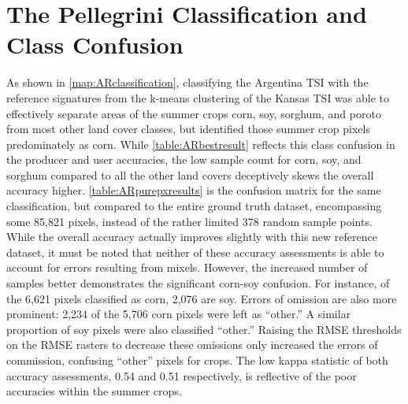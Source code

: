 \section{The Pellegrini Classification and Class Confusion}

As shown in \autoref{map:ARclassification}, classifying the Argentina TSI with the reference signatures from the k-means clustering of the Kansas TSI was able to effectively separate areas of the summer crops corn, soy, sorghum, and poroto from most other land cover classes, but identified those summer crop pixels predominately as corn. While \autoref{table:ARbestresult} reflects this class confusion in the producer and user accuracies, the low sample count for corn, soy, and sorghum compared to all the other land covers deceptively skews the overall accuracy higher. \autoref{table:ARpurepxresults} is the confusion matrix for the same classification, but compared to the entire ground truth dataset, encompassing some 85,821 pixels, instead of the rather limited 378 random sample points. While the overall accuracy actually improves slightly with this new reference dataset, it must be noted that neither of these accuracy assessments is able to account for errors resulting from mixels. However, the increased number of samples better demonstrates the significant corn-soy confusion. For instance, of the 6,621 pixels classified as corn, 2,076 are soy. Errors of omission are also more prominent: 2,234 of the 5,706 corn pixels were left as ``other.'' A similar proportion of soy pixels were also classified ``other.'' Raising the RMSE thresholds on the RMSE rasters to decrease these omissions only increased the errors of commission, confusing ``other'' pixels for crops. The low kappa statistic of both accuracy assessments, 0.54 and 0.51 respectively, is reflective of the poor accuracies within the summer crops.

